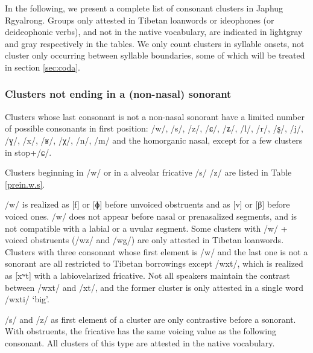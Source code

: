 \documentclass[oldfontcommands,oneside,a4paper,11pt]{article}
\begin{document}
In the following, we present a complete list of consonant clusters in Japhug Rgyalrong. Groups only attested in Tibetan loanwords or ideophones (or deideophonic verbs), and not in the native vocabulary, are indicated in lightgray and gray respectively in the tables. We only count clusters in syllable onsets, not cluster only occurring between syllable boundaries, some of which will be treated in section \ref{sec:coda}.
  
  
  \subsubsection{Clusters not ending in a (non-nasal) sonorant}  
Clusters whose last consonant is not a non-nasal sonorant have a limited number of possible consonants in first position: /w/, /s/, /z/, /ɕ/, /ʑ/, /l/, /r/, /ʂ/, /j/, /ɣ/, /x/, /ʁ/, /χ/, /n/, /m/ and the homorganic nasal, except for a few clusters in stop+/ɕ/.

 Clusters beginning in /w/ or in a alveolar fricative /s/ /z/ are listed in Table \ref{prein.w.s}. 
 
 /w/ is realized as [f] or [ɸ] before unvoiced obstruents and as [v] or [β] before voiced ones. /w/ does not appear before nasal or prenasalized segments, and is not compatible with a labial or a uvular segment. Some clusters with /w/ + voiced obstruents (/wz/ and /wg/) are only attested in Tibetan loanwords. Clusters with three consonant whose first element is /w/ and the last one is not a sonorant are all restricted to Tibetan borrowings except /wxt/, which is realized as [xʷt] with a labiovelarized fricative. Not all speakers maintain the contrast between /wxt/ and /xt/, and the former cluster is only attested in a single word /wxti/ `big'.
 
 /s/ and /z/ as first element of a cluster are only contrastive before a sonorant. With obstruents, the fricative has the same voicing value as the following consonant. All clusters of this type are attested in the native vocabulary.
 
\end{document}
